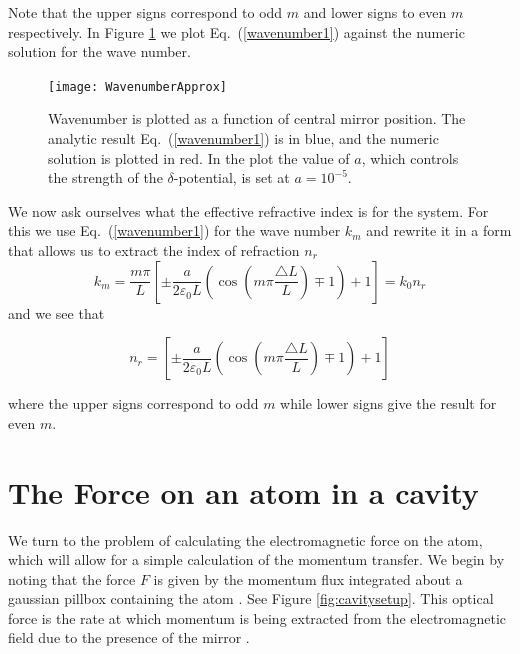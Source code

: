 \documentclass[twocolumn,english,pra,aps,superscriptaddress,floatfix]{revtex4-1}
\begin{document}
Note that the upper signs correspond to odd $m$ and lower signs to
even $m$ respectively.  In Figure \ref{fig:wavenumberapprox} we plot Eq.\ (\ref{wavenumber1}) against the numeric solution for the wave number. 



\begin{figure}
\texttt{[image: WavenumberApprox]}
\caption{Wavenumber is plotted as a function of central mirror position.  The analytic result Eq.\ (\ref{wavenumber1}) is in blue, and the numeric solution is plotted in red.  In the plot the value of $a$, which controls the strength of the $\delta$-potential, is set at $a=10^{-5}$. }
\label{fig:wavenumberapprox}
\end{figure}

We now ask ourselves what the effective refractive index is for the system. For this we use Eq.\ (\ref{wavenumber1}) for the wave number $k_{m}$ and rewrite it in a form that allows us to extract the index of refraction $n_{r}$
\begin{equation}
k_{m}=\frac{m\pi}{L}\left[\pm\frac{a}{2\varepsilon_{0}L}\left(\cos(m\pi\frac{\triangle L}{L})\mp1\right)+1\right]=k_{0} n_{r}
\label{wavenumber2}
\end{equation}
and we see that

\begin{equation}
n_{r}=\left[\pm\frac{a}{2\varepsilon_{0}L}\left(\cos(m\pi\frac{\triangle L}{L})\mp1\right)+1\right]
\label{refractiveindex}
\end{equation}

where the upper signs correspond to odd $m$ while lower signs give the result for even $m$.  

\section{The Force on an atom in a cavity}
\label{sec:force}
We turn to the problem of calculating the electromagnetic force on the atom, which will allow for a simple calculation of the momentum transfer. We begin by noting that the force $F$ is given by the momentum flux integrated about a gaussian pillbox containing the atom \cite{domokos08}. See Figure \ref{fig:cavitysetup}.  This optical force is the rate at which momentum is being extracted from the electromagnetic field due to the presence of the mirror  \cite{griffiths}.  
\end{document}
